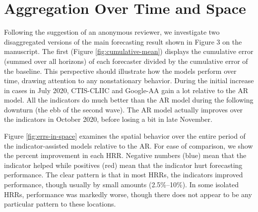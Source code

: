 

\section{Aggregation Over Time and Space}

Following the suggestion of an anonymous reviewer, we investigate two
disaggregated versions of the main forecasting result shown in Figure 3 on the
manuscript. The first (Figure \ref{fig:cumulative-mean}) displays the cumulative
error (summed over all horizons) of each forecaster divided by the cumulative
error of the baseline.  This perspective should illustrate how the models
perform over time, drawing attention to any nonstationary behavior.  During the
initial increase in cases in July 2020, CTIS-CLIIC and Google-AA gain a lot
relative to the AR model. All the indicators do much better than the AR model
during the following downturn (the ebb of the second wave). The AR model
actually improves over the indicators in October 2020, before losing a bit in
late November.

Figure \ref{fig:errs-in-space} examines the spatial behavior over the entire
period of the indicator-assisted models relative to the AR. For ease of
comparison, we show the percent improvement in each HRR. Negative numbers (blue)
mean that the indicator helped while positives (red) mean that the indicator
hurt forecasting performance. The clear pattern is that in most HRRs, the
indicators improved performance, though usually by small amounts (2.5\%--10\%).
In some isolated HRRs, performance was markedly worse, though there does not
appear to be any particular pattern to these locations.

